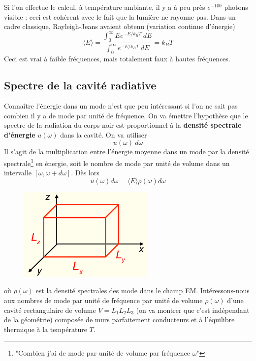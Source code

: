 	Si l'on effectue le calcul, à température ambiante, il y a à peu près $e^{-100}$ photons visible : ceci 
	est cohérent avec le fait que la lumière ne rayonne pas. Dans un cadre classique, Rayleigh-Jeans avaient 
	obtenu (variation continue d'énergie)
	\begin{equation}
	\langle E\rangle = \dfrac{\int_0^\infty Ee^{-E/k_BT}\ dE}{\int_0^\infty e^{-E/k_BT}\ dE} = k_BT
	\end{equation}
	Ceci est vrai à faible fréquences, mais totalement faux à hautes fréquences.
	
	\subsection{Spectre de la cavité radiative}
	Connaître l'énergie dans un mode n'est que peu intéressant si l'on ne sait pas combien il y a de mode
	par unité de fréquence. On va émettre l'hypothèse que le spectre de la radiation du corps noir est 
	proportionnel à la \textbf{densité spectrale d'énergie} $u(\omega)$ dans la cavité. On va utiliser
	\begin{equation}
	u(\omega)\ d\omega
	\end{equation}
	Il s'agit de la multiplication entre l'énergie moyenne dans un mode par la densité spectrale\footnote{"Combien 
	j'ai de mode par unité de volume par fréquence $\omega$"} en 	énergie, soit le nombre de mode par unité de
	volume dans un intervalle $[\omega,\omega+d\omega]$. Dès lors
	\begin{equation}
	u(\omega)d\omega = \langle E\rangle \rho(\omega)d\omega
	\end{equation}
	\begin{figure}
	\vspace{-5mm}
	\includegraphics[scale=0.5]{ch2/image9.png}
	\end{figure}
	où $\rho(\omega)$ est la densité spectrales des mode dans le champ EM. Intéressons-nous aux nombres de 
	mode par unité de fréquence par unité de volume $\rho(\omega)$ d'une cavité rectangulaire de volume 
	$V=L_1L_2L_3$ (on va montrer que c'est indépendant de la géométrie) composée de murs parfaitement 
	conducteurs et à l'équilibre thermique à la température $T$.
	\newpage
	
